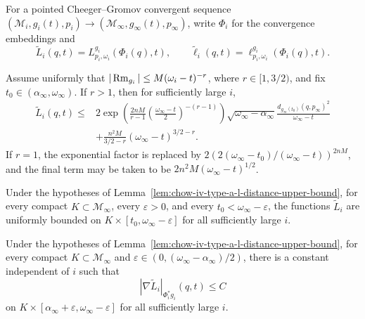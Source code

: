 For a pointed Cheeger--Gromov convergent sequence
\((\mathcal M_i,g_i(t),p_i)\to(\mathcal M_\infty,g_\infty(t),p_\infty)\),
write \(\Phi_i\) for the convergence embeddings and
\[
 \widetilde L_i(q,t)=L^{g_i}_{p_i,\omega_i}(\Phi_i(q),t),
 \qquad
 \widetilde\ell_i(q,t)=\ell^{g_i}_{p_i,\omega_i}(\Phi_i(q),t).
\]

\begin{lemma}
\label{lem:chow-iv-type-a-l-distance-upper-bound}


Assume uniformly that
\(|\operatorname{Rm}_{g_i}|\leq M(\omega_i-t)^{-r}\), where \(r\in[1,3/2)\), and fix
\(t_0\in(\alpha_\infty,\omega_\infty)\).  If \(r>1\), then for sufficiently
large \(i\),
\[
\begin{split}
 \widetilde L_i(q,t)\leq{}&
 2\exp\!\left(\frac{2nM}{r-1}
 \left(\frac{\omega_\infty-t}{2}\right)^{-(r-1)}\right)
 \sqrt{\omega_\infty-\alpha_\infty}
 \frac{d_{g_\infty(t_0)}(q,p_\infty)^2}{\omega_\infty-t}\\
 &+\frac{n^2M}{3/2-r}(\omega_\infty-t)^{3/2-r}.
\end{split}
\]
If \(r=1\), the exponential factor is replaced by
\(2(2(\omega_\infty-t_0)/(\omega_\infty-t))^{2nM}\), and the final term
may be taken to be \(2n^2M(\omega_\infty-t)^{1/2}\).
\end{lemma}

\begin{corollary}
\label{cor:chow-iv-type-a-l-distance-compact-bound}


Under the hypotheses of Lemma~\ref{lem:chow-iv-type-a-l-distance-upper-bound},
for every compact \(K\subset\mathcal M_\infty\), every
\(\varepsilon>0\), and every
\(t_0<\omega_\infty-\varepsilon\), the functions \(\widetilde L_i\) are
uniformly bounded on \(K\times[t_0,\omega_\infty-\varepsilon]\) for all
sufficiently large \(i\).
\end{corollary}

\begin{lemma}
\label{lem:chow-iv-type-a-l-distance-gradient-bound}


Under the hypotheses of Lemma~\ref{lem:chow-iv-type-a-l-distance-upper-bound},
for every compact \(K\subset\mathcal M_\infty\) and
\(\varepsilon\in(0,(\omega_\infty-\alpha_\infty)/2)\), there is a constant
independent of \(i\) such that
\[
 |\nabla\widetilde L_i|_{\Phi_i^*g_i}(q,t)\leq C
\]
on \(K\times[\alpha_\infty+\varepsilon,
\omega_\infty-\varepsilon]\) for all sufficiently large \(i\).
\end{lemma}

